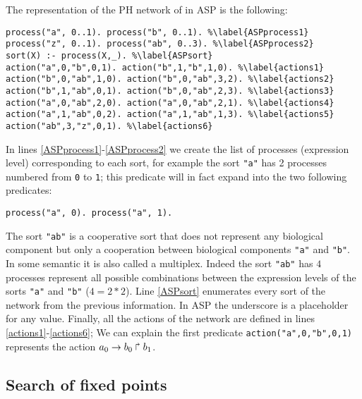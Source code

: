 \begin{example}
\label{ex:asp-ph}
The representation of the PH network of  in ASP is the following:
\begin{lstlisting}
process("a", 0..1). process("b", 0..1). %\label{ASPprocess1}
process("z", 0..1). process("ab", 0..3). %\label{ASPprocess2}
sort(X) :- process(X,_). %\label{ASPsort}
action("a",0,"b",0,1). action("b",1,"b",1,0). %\label{actions1}
action("b",0,"ab",1,0). action("b",0,"ab",3,2). %\label{actions2}
action("b",1,"ab",0,1). action("b",0,"ab",2,3). %\label{actions3}
action("a",0,"ab",2,0). action("a",0,"ab",2,1). %\label{actions4}
action("a",1,"ab",0,2). action("a",1,"ab",1,3). %\label{actions5}
action("ab",3,"z",0,1). %\label{actions6}
\end{lstlisting}
In lines \ref{ASPprocess1}-\ref{ASPprocess2} we create the list of processes (expression level) corresponding to each sort,
for example the sort \texttt{"a"} has 2 processes numbered from \texttt{0} to \texttt{1};
this predicate will in fact expand into the two following predicates:
\begin{lstlisting}[numbers=none]
process("a", 0). process("a", 1).
\end{lstlisting}
The sort \texttt{"ab"} is a cooperative sort that does not represent any biological component but only a cooperation between biological components \texttt{"a"} and \texttt{"b"}. In some semantic it is also called a multiplex. Indeed the sort \texttt{"ab"} has $4$ processes represent all possible combinations between the expression levels of the sorts \texttt{"a"} and \texttt{"b"} ($4=2*2$).
Line \ref{ASPsort} enumerates every sort of the network from the previous information.
In ASP the underscore is a placeholder for any value.
Finally, all the actions of the network are defined in lines \ref{actions1}-\ref{actions6};
We can explain the first predicate \texttt{action("a",0,"b",0,1)} represents the action
$a_0\rightarrow b_0\Rsh b_1$.
\end{example}

\subsection{Search of fixed points}


